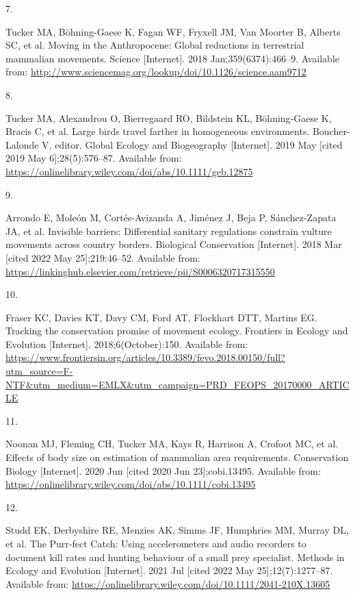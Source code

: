 \documentclass[10pt,a4paper]{article}
\newlength{\cslhangindent}
\newlength{\csllabelwidth}
\newlength{\cslentryspacingunit} %
\newenvironment{CSLReferences}[2] %
 {%
  \setlength{\parindent}{0pt}
  \ifodd #1
  \let\oldpar\par
  \def\par{\hangindent=\cslhangindent\oldpar}
  \fi
  \setlength{\parskip}{#2\cslentryspacingunit}
 }%
 {}
\newcommand{\CSLLeftMargin}[1]{\parbox[t]{\csllabelwidth}{#1}}
\newcommand{\CSLRightInline}[1]{\parbox[t]{\linewidth - \csllabelwidth}{#1}\break}
\begin{document}
\begin{CSLReferences}{0}{0}
\leavevmode{}%
\CSLLeftMargin{7. }
\CSLRightInline{Tucker MA, Böhning-Gaese K, Fagan WF, Fryxell JM, Van Moorter B, Alberts SC, et al. Moving in the {Anthropocene}: {Global} reductions in terrestrial mammalian movements. Science {[}Internet{]}. 2018 Jan;359(6374):466--9. Available from: \url{http://www.sciencemag.org/lookup/doi/10.1126/science.aam9712}}

\leavevmode{}%
\CSLLeftMargin{8. }
\CSLRightInline{Tucker MA, Alexandrou O, Bierregaard RO, Bildstein KL, Böhning‐Gaese K, Bracis C, et al. Large birds travel farther in homogeneous environments. Boucher-Lalonde V, editor. Global Ecology and Biogeography {[}Internet{]}. 2019 May {[}cited 2019 May 6{]};28(5):576--87. Available from: \url{https://onlinelibrary.wiley.com/doi/abs/10.1111/geb.12875}}

\leavevmode{}%
\CSLLeftMargin{9. }
\CSLRightInline{Arrondo E, Moleón M, Cortés-Avizanda A, Jiménez J, Beja P, Sánchez-Zapata JA, et al. Invisible barriers: {Differential} sanitary regulations constrain vulture movements across country borders. Biological Conservation {[}Internet{]}. 2018 Mar {[}cited 2022 May 25{]};219:46--52. Available from: \url{https://linkinghub.elsevier.com/retrieve/pii/S0006320717315550}}

\leavevmode{}%
\CSLLeftMargin{10. }
\CSLRightInline{Fraser KC, Davies KT, Davy CM, Ford AT, Flockhart DTT, Martins EG. Tracking the conservation promise of movement ecology. Frontiers in Ecology and Evolution {[}Internet{]}. 2018;6(October):150. Available from: \url{https://www.frontiersin.org/articles/10.3389/fevo.2018.00150/full?utm_source=F-NTF\&utm_medium=EMLX\&utm_campaign=PRD_FEOPS_20170000_ARTICLE}}

\leavevmode{}%
\CSLLeftMargin{11. }
\CSLRightInline{Noonan MJ, Fleming CH, Tucker MA, Kays R, Harrison A, Crofoot MC, et al. Effects of body size on estimation of mammalian area requirements. Conservation Biology {[}Internet{]}. 2020 Jun {[}cited 2020 Jun 23{]};cobi.13495. Available from: \url{https://onlinelibrary.wiley.com/doi/abs/10.1111/cobi.13495}}

\leavevmode{}%
\CSLLeftMargin{12. }
\CSLRightInline{Studd EK, Derbyshire RE, Menzies AK, Simms JF, Humphries MM, Murray DL, et al. The {Purr}‐fect {Catch}: {Using} accelerometers and audio recorders to document kill rates and hunting behaviour of a small prey specialist. Methods in Ecology and Evolution {[}Internet{]}. 2021 Jul {[}cited 2022 May 25{]};12(7):1277--87. Available from: \url{https://onlinelibrary.wiley.com/doi/10.1111/2041-210X.13605}}


\end{CSLReferences}
\end{document}
